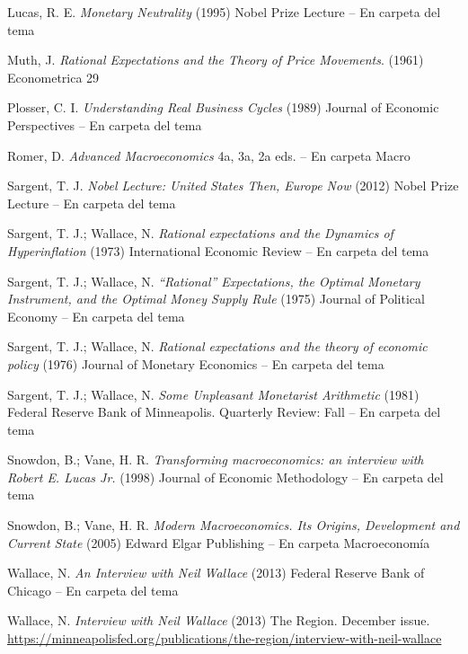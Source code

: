 \documentclass{nuevotema}
\begin{document}
Lucas, R. E. \textit{Monetary Neutrality} (1995) Nobel Prize Lecture -- En carpeta del tema

Muth, J. \textit{Rational Expectations and the Theory of Price Movements}. (1961) Econometrica 29 

Plosser, C. I. \textit{Understanding Real Business Cycles} (1989) Journal of Economic Perspectives -- En carpeta del tema

Romer, D. \textit{Advanced Macroeconomics} 4a, 3a, 2a eds. -- En carpeta Macro

Sargent, T. J. \textit{Nobel Lecture: United States Then, Europe Now} (2012) Nobel Prize Lecture -- En carpeta del tema

Sargent, T. J.; Wallace, N. \textit{Rational expectations and the Dynamics of Hyperinflation} (1973) International Economic Review -- En carpeta del tema

Sargent, T. J.; Wallace, N. \textit{``Rational'' Expectations, the Optimal Monetary Instrument, and the Optimal Money Supply Rule} (1975) Journal of Political Economy -- En carpeta del tema

Sargent, T. J.; Wallace, N. \textit{Rational expectations and the theory of economic policy} (1976) Journal of Monetary Economics -- En carpeta del tema

Sargent, T. J.; Wallace, N. \textit{Some Unpleasant Monetarist Arithmetic} (1981) Federal Reserve Bank of Minneapolis. Quarterly Review: Fall -- En carpeta del tema

Snowdon, B.; Vane, H. R. \textit{Transforming macroeconomics: an interview with Robert E. Lucas Jr.} (1998) Journal of Economic Methodology -- En carpeta del tema

Snowdon, B.; Vane, H. R. \textit{Modern Macroeconomics. Its Origins, Development and Current State} (2005) Edward Elgar Publishing --  En carpeta Macroeconomía

Wallace, N. \textit{An Interview with Neil Wallace} (2013) Federal Reserve Bank of Chicago -- En carpeta del tema

Wallace, N. \textit{Interview with Neil Wallace} (2013) The Region. December issue. \url{https://minneapolisfed.org/publications/the-region/interview-with-neil-wallace}
\end{document}
